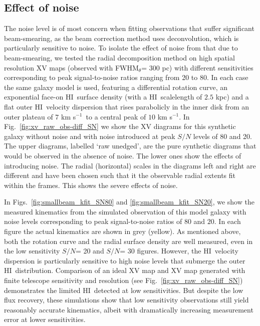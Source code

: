 \documentclass[traditabstract]{aa} %
\newcommand\HI{H{\small I}}
\newcommand\kms{km s$^{-1}$}
\begin{document}
\subsection{Effect of noise}
\label{sec:ch4-disc-eff-noise}


The noise level is of most concern when fitting observations that suffer
significant beam-smearing, as the beam correction method uses
deconvolution, which is particularly sensitive to noise. To isolate 
the effect of noise from that due to beam-smearing, we
tested the radial decomposition method on high spatial resolution XV
maps (observed with FWHM$_{\theta}$= 300 pc) with different
sensitivities corresponding to peak signal-to-noise ratios ranging
from 20 to 80. In each case the same galaxy model is used, featuring a
differential rotation curve, an exponential face-on \HI\ surface
density (with a \HI\ scalelength of $2.5$ kpc) and a flat outer \HI\
velocity dispersion that rises parabolicly in the inner disk from an
outer plateau of $7$ \kms\ to a central peak of $10$ \kms. In 
Fig.~\ref{fig:xv_raw_obs-diff_SN} we show the XV diagrams
for this synthetic galaxy without noise and with noise introduced
at peak $S/N$ levels of 80 and 20. The upper diagrams, labelled
`raw unedged', are the pure synthetic diagrams that would be observed 
in the absence of noise. The lower ones show the effects of introducing noise.
The radial (horizontal) scales in the diagrams left and right
are different and have been chosen such that it the observable radial extents
fit within the frames. This shows the severe effects of noise.

In Figs.~\ref{fig:smallbeam_kfit_SN80}
and \ref{fig:smallbeam_kfit_SN20}, we show the measured kinematics
from the simulated observation of this model galaxy with noise levels
corresponding to peak
signal-to-noise ratios of $80$  and $20$. In each figure the actual
kinematics are shown in grey (yellow).
As mentioned above, both the rotation curve and the
radial surface density are well measured, even in the low sensitivity
$S/N$= 20 and $S/N$= 30 figures. However, the \HI\ velocity dispersion is
particularly sensitive to high noise levels that submerge the outer
\HI\ distribution. Comparison of an ideal XV map and XV map generated
with finite telescope sensitivity and resolution
(see Fig.~\ref{fig:xv_raw_obs-diff_SN}) demonstrates the limited
\HI\ detected at low sensitivities. But despite the low flux recovery,
these simulations show that low sensitivity observations still yield
reasonably accurate kinematics, albeit with dramatically increasing
measurement error at lower sensitivities.
\end{document}

